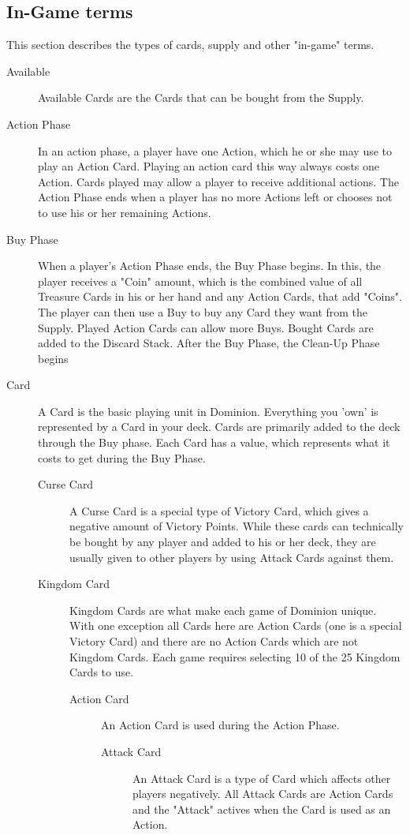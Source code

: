 \subsection{In-Game terms}
This section describes the types of cards, supply and other "in-game" terms.
\begin{description}
\item[Available] Available Cards are the Cards that can be bought from the Supply.
\item[Action Phase] In an action phase, a player have one Action, which he or she may use to play an Action Card. Playing an action card this way always costs one Action. Cards played may allow a player to receive additional actions. The Action Phase ends when a player has no more Actions left or chooses not to use his or her remaining Actions. 
\item[Buy Phase] When a player's Action Phase ends, the Buy Phase begins. In this, the player receives a "Coin" amount, which is the combined value of all Treasure Cards in his or her hand and any Action Cards, that add "Coins". The player can then use a Buy to buy any Card they want from the Supply. Played Action Cards can allow more Buys. Bought Cards are added to the Discard Stack. After the Buy Phase, the Clean-Up Phase begins
\item[Card] A Card is the basic playing unit in Dominion. Everything you 'own' is represented by a Card in your deck. Cards are primarily added to the deck through the Buy phase. Each Card has a value, which represents what it costs to get during the Buy Phase.
\begin{description}
\item[Curse Card] A Curse Card is a special type of Victory Card, which gives a negative amount of Victory Points. While these cards can technically be bought by any player and added to his or her deck, they are usually given to other players by using Attack Cards against them.
\item[Kingdom Card] Kingdom Cards are what make each game of Dominion unique. With one exception all Cards here are Action Cards (one is a special Victory Card) and there are no Action Cards which are not Kingdom Cards. Each game requires selecting 10 of the 25 Kingdom Cards to use.
\begin{description}
\item[Action Card] An Action Card is used during the Action Phase.
\begin{description}
\item[Attack Card] An Attack Card is a type of Card which affects other players negatively. All Attack Cards are Action Cards and the "Attack" actives when the Card is used as an Action.

\end{description}
\end{description}
\end{description}
\end{description}
